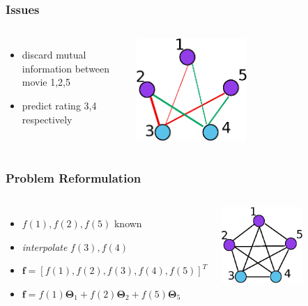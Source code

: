 \documentclass{beamer}
\begin{document}
\begin{frame}
\frametitle{Issues}
\begin{columns}
\begin{itemize}
\item discard mutual information between movie 1,2,5\\\quad
\item predict rating 3,4 respectively
\end{itemize}
\includegraphics[width=0.5\textwidth]{movie5_knn_issues.eps}
\end{columns}
\end{frame}

\begin{frame}
\frametitle{Problem Reformulation}
\begin{columns}
\begin{itemize}
\item $f(1),f(2),f(5)$ known \\\quad
\item \textit{interpolate} $f(3),f(4)$\\\quad
\item $\bm{f}=[f(1),f(2),f(3),f(4),f(5)]^T$\\\quad
\item $\bm{f}=f(1)\bm{\Theta}_1 + f(2)\bm{\Theta}_2 + f(5)\bm{\Theta}_5$
\end{itemize}
\includegraphics[width=0.6\textwidth]{movie5.eps}
\end{columns}
\end{frame}
\end{document}

